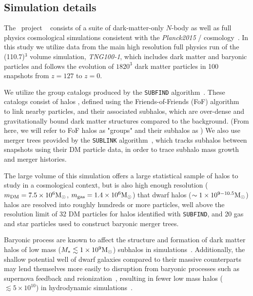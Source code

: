 \documentclass[twocolumn]{aastex631}
\begin{document}
    \subsection{Simulation details} \label{sec:methods-sims}
    The \tng\ project ~\citep{TNG1, TNG2, TNG3, TNG4, TNG5} consists of a suite of dark-matter-only $N$-body as well as full physics cosmological simulations consistent with the \textit{Planck2015} \lcdm/  cosmology~\citep{Planck2015}.
    In this study we utilize data from the main high resolution full physics run of the (110.7\Mpc)$^3$ volume simulation, \textsl{TNG100-1}, which includes dark matter and baryonic particles and follows the evolution of $1820^3$ dark matter particles in 100 snapshots from $z=127$ to $z=0$. 

    We utilize the group catalogs produced by the \texttt{SUBFIND} algorithm~\citep{springel2001,dolag09}. 
    These catalogs consist of halos , defined using the Friends-of-Friends (FoF) algorithm~\citep{davis1985} to link nearby particles, and their associated subhalos, which are over-dense and gravitationally bound dark matter structures compared to the background. (From here, we will refer to FoF halos as "groups" and their subhalos as )
    We also use merger trees provided by the \texttt{SUBLINK} algorithm~\citep{RG2015}, which tracks subhalos between snapshots using their DM particle data, in order to trace subhalo mass growth and merger histories.
    
    The large volume of this simulation offers a large statistical sample of halos to study in a cosmological context, but is also high enough resolution ($m_{\rm DM} = 7.5\times10^6\mathrm{M}_\odot$, $m_{\rm gas} = 1.4\times10^6\mathrm{M}_\odot$) that dwarf halos ($\sim1\times10^{9-10.5}\mathrm{M}_\odot$) halos are resolved into roughly hundreds or more particles, well above the resolution limit of 32 DM particles for halos identified with \texttt{SUBFIND}, and 20 gas and star particles used to construct baryonic merger trees.  

    Baryonic process are known to affect the structure and formation of dark matter halos of low mass ($M_*\lesssim 1\times10^9\mathrm{M}_\odot$) subhalos in simulations~\citep[see e.g.][and references therein]{Sales:2022}.
    Additionally, the shallow potential well of dwarf galaxies compared to their massive counterparts may lend themselves more easily to disruption from baryonic processes such as supernova feedback and reionization~\citep{}, resulting in fewer low mass halos ($\lesssim 5\times10^{10}$) in hydrodynamic simulations~\citep{vogelsberger14B}.
\end{document}
